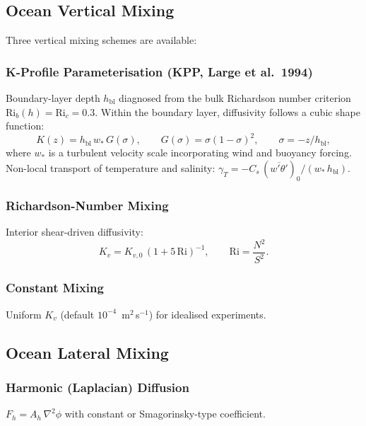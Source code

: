 \documentclass[11pt,a4paper]{article}
\begin{document}
\subsection{Ocean Vertical Mixing}

Three vertical mixing schemes are available:

\subsubsection{K-Profile Parameterisation (KPP, Large et al.\ 1994)}
Boundary-layer depth $h_{\mathrm{bl}}$ diagnosed from the bulk Richardson number criterion $\mathrm{Ri}_b(h)=\mathrm{Ri}_c=0.3$.  Within the boundary layer, diffusivity follows a cubic shape function:
\begin{equation}
  K(z) = h_{\mathrm{bl}}\,w_*\,G(\sigma), \qquad G(\sigma)=\sigma(1-\sigma)^2, \qquad \sigma=-z/h_{\mathrm{bl}},
\end{equation}
where $w_*$ is a turbulent velocity scale incorporating wind and buoyancy forcing.  Non-local transport of temperature and salinity: $\gamma_T=-C_s\,(\overline{w'\theta'})_0/(w_*\,h_{\mathrm{bl}})$.

\subsubsection{Richardson-Number Mixing}
Interior shear-driven diffusivity:
\begin{equation}
  K_v = K_{v,0}\,(1+5\,\mathrm{Ri})^{-1}, \qquad \mathrm{Ri}=\frac{N^2}{S^2}.
\end{equation}

\subsubsection{Constant Mixing}
Uniform $K_v$ (default $10^{-4}$~m$^2$\,s$^{-1}$) for idealised experiments.

\subsection{Ocean Lateral Mixing}

\subsubsection{Harmonic (Laplacian) Diffusion}
$F_h = A_h\,\nabla^2\phi$ with constant or Smagorinsky-type coefficient.
\end{document}
